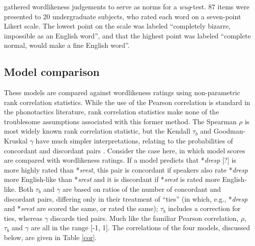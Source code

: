 \subsubsection{\citealt{Albright2003b}}

\citet{Albright2003b} gathered wordlikeness judgements to serve as norms for a \emph{wug}-test. 87 items were presented to 20 undergraduate subjects, who rated each word on a seven-point Likert scale. The lowest point on the scale was labeled ``completely bizarre, impossible as an English word'', and that the highest point was labeled ``complete normal, would make a fine English word''.

\subsection{Model comparison}

These models are compared against wordlikeness ratings using non-parametric rank correlation statistics. While the use of the Pearson correlation is standard in the phonotactics literature, rank correlation statistics make none of the troublesome assumptions associated with this former method. The Spearman $\rho$ is most widely known rank correlation statistic, but the Kendall $\tau_b$ and Goodman-Kruskal $\gamma$ have much simpler interpretations, relating to the probabilities of {concordant} and {discordant} pairs \citep{Noether1981}. Consider the case here, in which model scores are compared with wordlikeness ratings. If a model predicts that *\emph{dresp} [?] is more highly rated than *\emph{srest}, this pair is {concordant} if speakers also rate *\emph{dresp} more English-like than *\emph{srest} and it is discordant if *\emph{srest} is rated more English-like. Both $\tau_b$ and $\gamma$ are based on ratios of the number of concordant and discordant pairs, differing only in their treatment of ``ties'' (in which, e.g., *\emph{dresp} and *\emph{srest} are scored the same, or rated the same); $\tau_b$ includes a correction for ties, whereas $\gamma$ discards tied pairs. Much like the familiar Pearson correlation, $\rho$, $\tau_b$ and $\gamma$ are all in the range [-1, 1]. The correlations of the four models, discussed below, are given in Table \ref{cor}.


